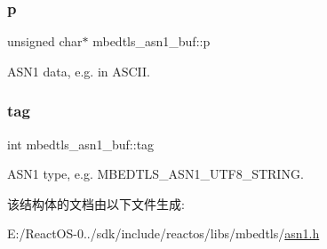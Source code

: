 \subsubsection{\texorpdfstring{p}{p}}
{\footnotesize\ttfamily unsigned char$\ast$ mbedtls\+\_\+asn1\+\_\+buf\+::p}

A\+S\+N1 data, e.\+g. in A\+S\+C\+II. \mbox{\label{structmbedtls__asn1__buf_abcca2df9a773acd5b59831ac55993dd1}} 
\subsubsection{\texorpdfstring{tag}{tag}}
{\footnotesize\ttfamily int mbedtls\+\_\+asn1\+\_\+buf\+::tag}

A\+S\+N1 type, e.\+g. M\+B\+E\+D\+T\+L\+S\+\_\+\+A\+S\+N1\+\_\+\+U\+T\+F8\+\_\+\+S\+T\+R\+I\+NG. 

该结构体的文档由以下文件生成\+:\begin{DoxyCompactItemize}
\item 
E\+:/\+React\+O\+S-\/0../sdk/include/reactos/libs/mbedtls/\hyperlink{asn1_8h}{asn1.\+h}\end{DoxyCompactItemize}
